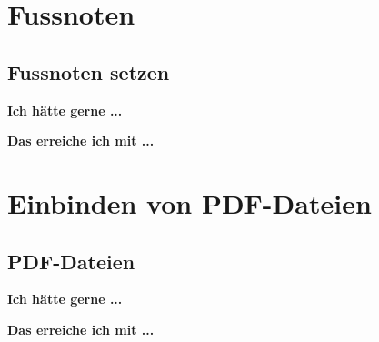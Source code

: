\documentclass[twoside, 
               a4paper, 
              10pt, 
               parskip=full, 
               sectionentrydots=true, 
               listof=totoc, 
               listof=entryprefix,
               numbers=endperiod]{scrartcl}
\begin{document}

\newpage
\section{Fussnoten}
\subsection{Fussnoten setzen}

{\textbf {Ich hätte gerne ...}}
 
\begin{miniSeite}[colbacktitle=black!35!white,title=Ausdruck]

\end{miniSeite}


\newpage
{\textbf {Das erreiche ich mit ...}}
 
\begin{miniSeite}[colbacktitle=black!35!white,title=\LaTeX-Code]

\end{miniSeite}





\newpage
\section{Einbinden von PDF-Dateien}
\subsection{PDF-Dateien}

{\textbf {Ich hätte gerne ...}}
 
\begin{miniSeite}[colbacktitle=black!35!white,title=Ausdruck]

\end{miniSeite}


\newpage
{\textbf {Das erreiche ich mit ...}}
 
\begin{miniSeite}[colbacktitle=black!35!white,title=\LaTeX-Code]

\end{miniSeite}

\end{document}
